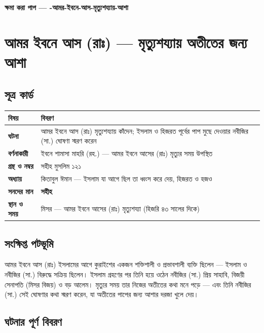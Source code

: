 

\begin{center}{\Large\bfseries\color{emerald} ক্ষমা করা পাপ — -আমর-ইবনে-আস-মৃত্যুশয্যায়-আশা}\end{center}
\vspace{1em}
\section*{আমর ইবনে আস (রাঃ) — মৃত্যুশয্যায় অতীতের জন্য আশা}

\subsection*{সূত্র কার্ড}

\begin{table}[h]\centering\small
\begin{tabular}{ll}
বিষয় & বিবরণ \\
\hline
\textbf{ঘটনা} & আমর ইবনে আস (রাঃ) মৃত্যুশয্যায় কাঁদেন; ইসলাম ও হিজরত পূর্বের পাপ মুছে দেওয়ার নবীজির (সা.) ঘোষণা স্মরণ করেন \\
\textbf{বর্ণনাকারী} & ইবনে শামাসা মাহরি (রহ.) — আমর ইবনে আসের (রাঃ) মৃত্যুর সময় উপস্থিত \\
\textbf{গ্রন্থ ও নম্বর} & সহীহ মুসলিম ১২১ \\
\textbf{অধ্যায়} & কিতাবুল ঈমান — \lat{“}ইসলাম যা আগে ছিল তা ধ্বংস করে দেয়, হিজরত ও হজও\lat{”} \\
\textbf{সনদের মান} & \textbf{সহীহ} \\
\textbf{স্থান ও সময়} & মিসর — আমর ইবনে আসের (রাঃ) মৃত্যুশয্যা (হিজরি ৪৩ সালের দিকে) \\
\hline
\end{tabular}
\end{table}

\subsection*{সংক্ষিপ্ত পটভূমি}

আমর ইবনে আস (রাঃ) ইসলামের আগে কুরাইশের একজন শক্তিশালী ও প্রভাবশালী ব্যক্তি ছিলেন — ইসলাম ও নবীজির (সা.) বিরুদ্ধে সক্রিয় ছিলেন। ইসলাম গ্রহণের পর তিনি হয়ে ওঠেন নবীজির (সা.) প্রিয় সাহাবি, বিজয়ী সেনাপতি (মিসর বিজয়) ও বড় আলেম। মৃত্যুর সময় তার নিজের অতীতের কথা মনে পড়ে — এবং তিনি নবীজির (সা.) সেই ঘোষণার কথা স্মরণ করেন, যা অতীতের পাপের জন্য আশার দরজা খুলে দেয়।

\subsection*{ঘটনার পূর্ণ বিবরণ}

